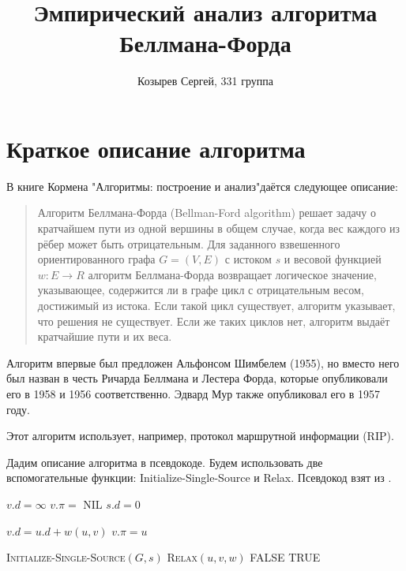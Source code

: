 \documentclass[a4paper,12pt]{article}
\newcommand{\TITLE}[1]{\item[#1]}
\begin{document}
\title{Эмпирический анализ алгоритма Беллмана-Форда}
\author{Козырев Сергей, 331 группа}
\maketitle

\newpage
\tableofcontents

\newpage
\section{Краткое описание алгоритма}
В книге Кормена "Алгоритмы: построение и анализ"\hspace{1mm}даётся следующее 
описание\cite[с.~688]{cormen}:
\begin{quotation}
Алгоритм Беллмана-Форда (Bellman-Ford algorithm) решает задачу о кратчайшем 
пути из одной вершины в общем случае, когда вес каждого из рёбер может быть 
отрицательным.
Для заданного взвешенного ориентированного графа $G = (V, E)$ с
истоком $s$ и весовой функцией $w : E \rightarrow R$ алгоритм Беллмана-Форда 
возвращает логическое значение, указывающее, содержится ли в графе цикл с 
отрицательным весом, достижимый из истока.
Если такой цикл существует, алгоритм указывает, что решения не существует.
Если же таких циклов нет, алгоритм выдаёт кратчайшие пути и их
веса.
\end{quotation}

Алгоритм впервые был предложен Альфонсом Шимбелем (1955), но вместо него был 
назван в честь Ричарда Беллмана и Лестера Форда, которые опубликовали его в 
1958 и 1956 соответственно.
Эдвард Мур также опубликовал его в 1957 году.\cite[с.~32-33]{schrijver}

Этот алгоритм использует, например, протокол маршрутной информации 
(RIP).\cite{semenov}

Дадим описание алгоритма в псевдокоде.
Будем использовать две вспомогательные функции: 
Initialize-Single-Source и Relax.
Псевдокод взят из \cite[с.~686,~689]{cormen}.
\begin{algorithmic}[1]
  \TITLE{\textsc{Initialize-Single-Source}$(G, s)$}
    \STATE $v.d = \infty$
    \STATE $v.\pi =$ NIL
  \ENDFOR
  \STATE $s.d = 0$
\end{algorithmic}
\begin{algorithmic}[1]
  \TITLE{\textsc{Relax}$(u, v, w)$}
    \STATE $v.d = u.d + w(u, v)$
    \STATE $v.\pi = u$
  \ENDIF
\end{algorithmic}
\newpage
\begin{algorithmic}[1]
  \TITLE{\textsc{Bellman-Ford}$(G, w, s)$}
  \STATE \textsc{Initialize-Single-Source}$(G, s)$
      \STATE \textsc{Relax}$(u, v, w)$
    \ENDFOR
  \ENDFOR
      \RETURN FALSE
    \ENDIF
  \ENDFOR
  \RETURN TRUE
\end{algorithmic}
\end{document}
